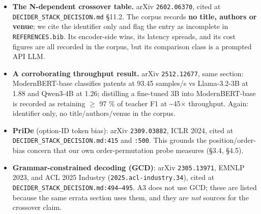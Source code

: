\documentclass[11pt,a4paper]{article}
\begin{document}
\begin{itemize}
\item \textbf{The N-dependent crossover table.} arXiv \texttt{2602.06370}\cite{arxiv2602_06370}, cited at \texttt{DECIDER\_STACK\_DECISION.md} \S11.2. The corpus records \textbf{no title, authors or venue}; we cite the identifier only and flag the entry as incomplete in \texttt{REFERENCES.bib}. Its encoder-side wins, its latency spreads, and its cost figures are all recorded in the corpus, but its comparison class is a prompted API LLM.
\item \textbf{A corroborating throughput result.} arXiv \texttt{2512.12677}\cite{arxiv2512_12677}, same section: ModernBERT-base classifies patents at 93.45 samples/s vs Llama-3.2-3B at 1.88 and Qwen3-4B at 1.26; distilling a fine-tuned 3B into ModernBERT-base is recorded as retaining $\ge$ 97 \% of teacher F1 at \textasciitilde{}45$\times$ throughput. Again: identifier only, no title/authors/venue in the corpus.
\item \textbf{PriDe} (option-ID token bias): arXiv \texttt{2309.03882}\cite{pride2309_03882}, ICLR 2024, cited at \texttt{DECIDER\_STACK\_DECISION.md:415} and \texttt{:500}. This grounds the position/order-bias concern that our own order-permutation probe measures (\S3.4, \S4.5).
\item \textbf{Grammar-constrained decoding (GCD)}: arXiv \texttt{2305.13971}\cite{gcd2305_13971}, EMNLP 2023, and ACL 2025 Industry (\texttt{2025.acl-industry.34}), cited at \texttt{DECIDER\_STACK\_DECISION.md:494--495}. A3 does not use GCD; these are listed because the same errata section uses them, and they are \emph{not} sources for the crossover claim.
\end{itemize}
\end{document}
